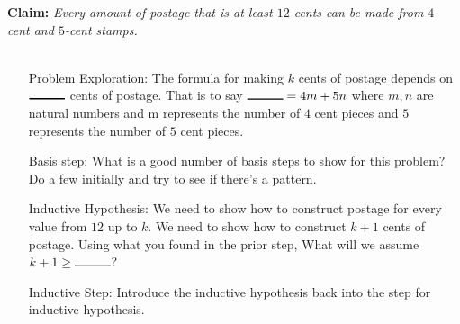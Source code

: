 \documentclass[12pt]{article}
\begin{document}
\begin{enumerate}
\textbf{Claim: }\textit{Every amount of postage that is at least $12$ cents can be made from
$4$-cent and $5$-cent stamps.}\\\\
\begin{enumerate}
      \item[Problem Exploration:] The formula for making $k$ cents of postage depends on 
      $\rule{1cm}{0.30mm}$ cents of postage. That is to say $\rule{1cm}{0.30mm} = 4m + 5n$ where 
      $m,n$ are natural numbers and m represents the number of $4$ cent pieces and $5$ represents the number
      of $5$ cent pieces.
      \item[Basis step: ]What is a good number of basis steps to show for this 
      problem? Do a few initially and try to see if there's a pattern.
      \item[Inductive Hypothesis: ]We need to show how to construct postage for every 
      value from $12$ up to $k$. We need to show how to construct $k+1$ cents 
      of postage. Using what you found in the prior step, What will we assume 
      $k+1 \ge \rule{1cm}{0.30mm}$?
      \item[Inductive Step: ] Introduce the inductive hypothesis back into the step for inductive hypothesis.
\end{enumerate}
\end{enumerate}
\end{document}
